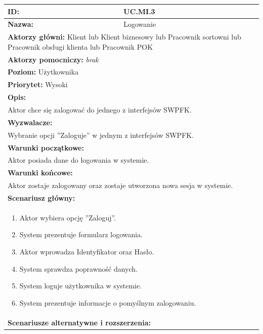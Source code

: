 \begin{center}
\begin{longtable}[h]{|p{1.6cm}|p{13.5cm}|}
\hline
\textbf{ID:} & UC.MI.3 \\ \hline
\textbf{Nazwa:} & Logowanie \\ \hline
\multicolumn{2}{|p{15.1cm}|}{\textbf{Aktorzy główni:} Klient lub Klient biznesowy lub Pracownik sortowni lub Pracownik obsługi klienta lub Pracownik POK} \\
\multicolumn{2}{|p{15.1cm}|}{\textbf{Aktorzy pomocniczy:} 
\textit{brak}} \\
\multicolumn{2}{|p{15.1cm}|}{\textbf{Poziom:} Użytkownika} \\
\multicolumn{2}{|p{15.1cm}|}{\textbf{Priorytet:} Wysoki} \\
\hline
\multicolumn{2}{|p{15.1cm}|}{\textbf{Opis:}} \\
\multicolumn{2}{|p{15.1cm}|}{
Aktor chce się zalogować do jednego z interfejsów SWPFK.
} \\ \hline
\multicolumn{2}{|p{15.1cm}|}{\textbf{Wyzwalacze:}} \\
\multicolumn{2}{|p{15.1cm}|}{
Wybranie opcji ''Zaloguje'' w jednym z interfejsów SWPFK.
} \\ \hline
\multicolumn{2}{|p{15.1cm}|}{\textbf{Warunki początkowe:}} \\
\multicolumn{2}{|p{15.1cm}|}{
Aktor posiada dane do logowania w systemie.
} \\ \hline
\multicolumn{2}{|p{15.1cm}|}{\textbf{Warunki końcowe:}} \\
\multicolumn{2}{|p{15.1cm}|}{
Aktor zostaje zalogowany oraz zostaje utworzona nowa sesja w systemie.
} \\ \hline
\multicolumn{2}{|p{15.1cm}|}{\textbf{Scenariusz główny:}} \\
\multicolumn{2}{|p{15.1cm}|}{
\begin{enumerate}
\item Aktor wybiera opcję ''Zaloguj''.
\item System prezentuje formularz logowania.
\item Aktor wprowadza Identyfikator oraz Hasło.
\item System sprawdza poprawność danych.
\item System loguje użytkownika w systemie.
\item System prezentuje informacje o pomyślnym zalogowaniu.
\end{enumerate}
} \\ \hline
\multicolumn{2}{|p{15.1cm}|}{\textbf{Scenariusze alternatywne i rozszerzenia:}} \\

\end{longtable}
\end{center}

